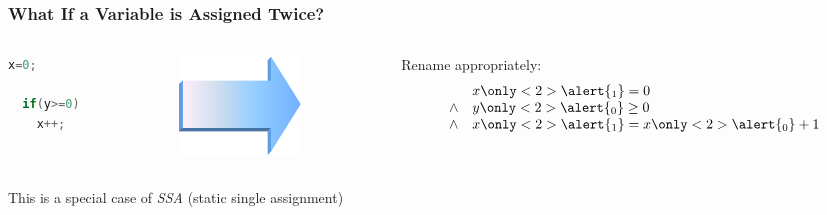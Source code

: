 
\begin{frame}[fragile]
\frametitle{What If a Variable is Assigned Twice?}

\begin{columns}
\begin{column}{.3\textwidth}
\begin{lstlisting}[language=C,basicstyle=\rmfamily,escapechar=\$,columns=flexible]
  x=0;

  if(y>=0)
    x++;
\end{lstlisting}
\end{column}
\begin{column}{.1\textwidth}
\includegraphics[width=\textwidth]{arrow}
\end{column}
\begin{column}{.5\textwidth}
Rename appropriately:
\[\begin{array}{ll}
      & x\only<2>{\alert{_1}}=0 \\
\land & y\only<2>{\alert{_0}}\ge 0 \\
\land & x\only<2>{\alert{_1}}=x\only<2>{\alert{_0}}+1
\end{array}\]
\end{column}
\end{columns}
\pause
\vfill
\begin{center}
This is a special case of \emph{SSA}
(static single assignment)
\end{center}

\end{frame}

